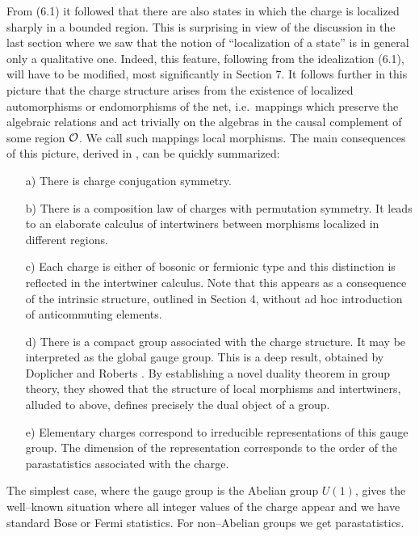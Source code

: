 {}From (6.1) it followed that there are also states in which the
charge is localized sharply in a bounded region. 
This is surprising in view of the discussion in the last section
where we saw that the notion of ``localization of a state'' is in 
general only a qualitative one. Indeed, this feature, following
from the idealization (6.1), will have to be modified, most 
significantly in Section 7. It follows further in this picture that 
the charge structure
arises from the existence of localized automorphisms or endomorphisms
of the net, i.e.\ mappings which preserve the algebraic relations and 
act trivially on the algebras in the causal
complement of some region ${\cal O}$. We call such mappings local 
morphisms. The main consequences of this picture, derived in
\cite{DoHaRo,DoRo}, can be quickly summarized: 
\begin{itemize} 
\item[a)] There is charge conjugation symmetry.
\item[b)] There is a composition law of charges with permutation 
symmetry. It leads to an elaborate calculus of intertwiners between
morphisms localized in different regions.
\item[c)] Each charge is either of bosonic or fermionic type and this
  distinction is reflected in the intertwiner calculus. Note that
this appears as a consequence of the intrinsic structure, outlined
in Section 4, without ad hoc introduction of anticommuting elements.
\item[d)] There is a compact group associated with the charge
  structure. It may be interpreted as the global gauge group.
This is a deep result, obtained by Doplicher and Roberts \cite{DoRo}.
By establishing a novel duality theorem in group theory, they showed 
that the structure of local morphisms and intertwiners, alluded to 
above, defines precisely the dual object of a group. 
\item[e)]Elementary charges correspond to irreducible representations
  of this gauge group. The dimension of the representation corresponds
  to the order of the parastatistics associated with the charge.
\end{itemize}
The simplest case, where the gauge group is the Abelian group $U(1)$, 
gives the well--known situation where all integer values of the charge
appear and we have standard Bose or Fermi statistics. For non--Abelian
groups we get parastatistics. 

